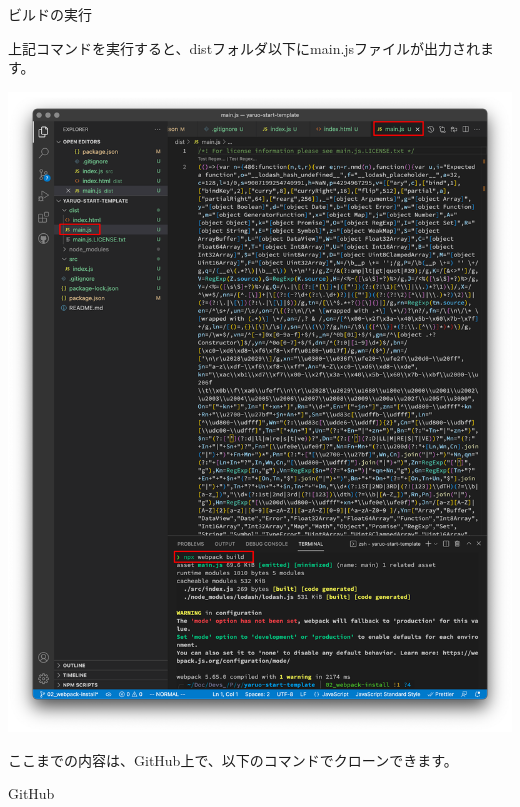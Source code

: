 \clearpage

\def\startercodeblockfontsize{}
\begin{starterterminal}[]{ビルドの実行}\end{starterterminal}

上記コマンドを実行すると、distフォルダ以下にmain.jsファイルが出力されます。

\begin{reviewimage}%
\includegraphics[width=0.8\maxwidth]{./images/02-create-react-app/webpack_test03.png}%
\label{image:02-create-react-app:webpack_test03}
\end{reviewimage}

\clearpage

\begin{starternote}[]{}

ここまでの内容は、GitHub上で、以下のコマンドでクローンできます。

\def\startercodeblockfontsize{}
\begin{starterterminal}[]{GitHub}\end{starterterminal}
\end{starternote}

